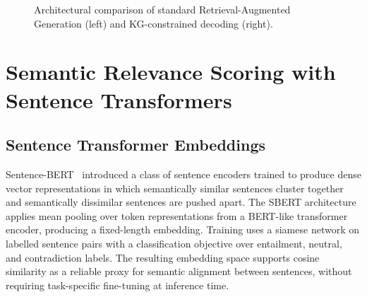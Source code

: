 \begin{figure}[H]
{
    }
    \caption{Architectural comparison of standard Retrieval-Augmented Generation (left) and KG-constrained decoding (right).}
    \label{fig:rag_vs_constrained}
\end{figure}

\section{Semantic Relevance Scoring with Sentence Transformers}
\label{sec:sbert}

\subsection{Sentence Transformer Embeddings}

Sentence-BERT~\citep{reimers2019sbert} introduced a class of sentence encoders trained to produce dense vector representations in which semantically similar sentences cluster together and semantically dissimilar sentences are pushed apart. The SBERT architecture applies mean pooling over token representations from a BERT-like transformer encoder, producing a fixed-length embedding. Training uses a siamese network on labelled sentence pairs with a classification objective over entailment, neutral, and contradiction labels. The resulting embedding space supports cosine similarity as a reliable proxy for semantic alignment between sentences, without requiring task-specific fine-tuning at inference time.

